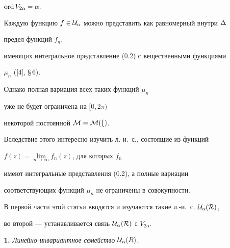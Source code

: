 $\operatorname{ord} V_{2\alpha}=\alpha$.





Каждую функцию $f\in \cal U_\alpha$ можно представить как равномерный внутри $\Delta$


предел функций $f_n$,


имеющих интегральное представление (0.2) с вещественными функциями


$\mu_n$ ([4], \S\,6).


Однако полная вариация всех таких функций $\mu_n$


уже не будет ограничена на $[0,2\pi)$


некоторой постоянной $\cal M=\cal M(f)$.


Вследствие этого интересно изучить л.-и.~с., состоящие из функций


$f(z)=\lim\limits_{n\to\infty} f_n(z)$, для которых $f_n$


имеют интегральные представления (0.2), а полные вариации


соответствующих функций $\mu_n$ не ограничены в совокупности.





В первой части этой статьи вводятся и изучаются такие л.-и.~с. $\cal U_\alpha(R)$,


во второй --- устанавливается связь $\cal U_\alpha(R)$ с $V_{2\alpha}$.


\medskip





{\bf 1.} {\it Линейно-инвариантное семейство $\bold{\cal U_\alpha}(R)$.}





